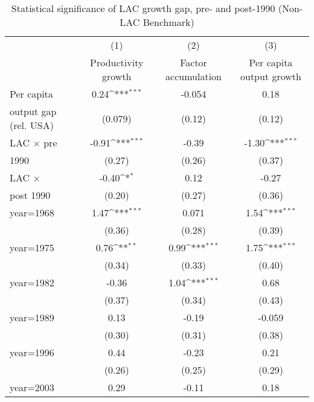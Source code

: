\begin{table}[htbp]\centering
\def\sym#1{\ifmmode^{#1}\else\(^{#1}\)\fi}
\caption{Statistical significance of LAC growth gap, pre- and post-1990 (Non-LAC Benchmark)}
\begin{tabular}{l*{3}{c}}
\toprule
                &\multicolumn{1}{c}{(1)}&\multicolumn{1}{c}{(2)}&\multicolumn{1}{c}{(3)}\\
                &\multicolumn{1}{c}{Productivity growth}&\multicolumn{1}{c}{Factor accumulation}&\multicolumn{1}{c}{Per capita output growth}\\
\midrule
Per capita      &     0.24\sym{***}&   -0.054         &     0.18         \\
output gap (rel. USA)&  (0.079)         &   (0.12)         &   (0.12)         \\
\addlinespace
LAC $\times$ pre&    -0.91\sym{***}&    -0.39         &    -1.30\sym{***}\\
1990            &   (0.27)         &   (0.26)         &   (0.37)         \\
\addlinespace
LAC $\times$    &    -0.40\sym{*}  &     0.12         &    -0.27         \\
post 1990       &   (0.20)         &   (0.27)         &   (0.36)         \\
\addlinespace
year=1968       &     1.47\sym{***}&    0.071         &     1.54\sym{***}\\
                &   (0.36)         &   (0.28)         &   (0.39)         \\
\addlinespace
year=1975       &     0.76\sym{**} &     0.99\sym{***}&     1.75\sym{***}\\
                &   (0.34)         &   (0.33)         &   (0.40)         \\
\addlinespace
year=1982       &    -0.36         &     1.04\sym{***}&     0.68         \\
                &   (0.37)         &   (0.34)         &   (0.43)         \\
\addlinespace
year=1989       &     0.13         &    -0.19         &   -0.059         \\
                &   (0.30)         &   (0.31)         &   (0.38)         \\
\addlinespace
year=1996       &     0.44         &    -0.23         &     0.21         \\
                &   (0.26)         &   (0.25)         &   (0.29)         \\
\addlinespace
year=2003       &     0.29         &    -0.11         &     0.18         \\

\end{tabular}
\end{table}

